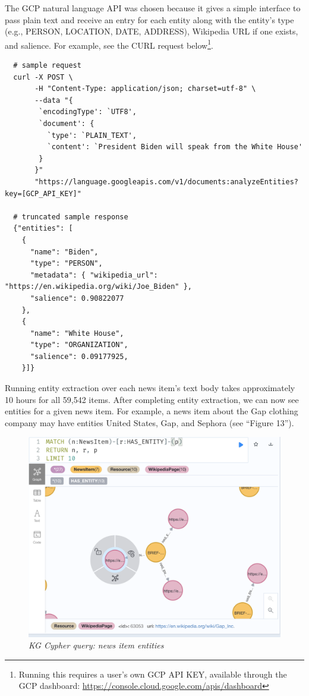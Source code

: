 \documentclass[11pt]{article}
\begin{document}
  The GCP natural language API was chosen because it gives a simple interface to pass plain text and receive an entry for each entity along with the entity's type (e.g., PERSON, LOCATION, DATE, ADDRESS), Wikipedia URL if one exists, and salience. For example, see the CURL request below\footnote{Running this requires a user's own GCP API KEY, available through the GCP dashboard: \url{https://console.cloud.google.com/apis/dashboard}}.
  \begin{lstlisting}
  # sample request
  curl -X POST \
       -H "Content-Type: application/json; charset=utf-8" \
       --data "{
        `encodingType': `UTF8',
        `document': {
          `type': `PLAIN_TEXT',
          `content': `President Biden will speak from the White House'
        }
       }"
       "https://language.googleapis.com/v1/documents:analyzeEntities?key=[GCP_API_KEY]"

  # truncated sample response
  {"entities": [
    {
      "name": "Biden",
      "type": "PERSON",
      "metadata": { "wikipedia_url": "https://en.wikipedia.org/wiki/Joe_Biden" },
      "salience": 0.90822077
    },
    {
      "name": "White House",
      "type": "ORGANIZATION",
      "salience": 0.09177925,
    }]}

  \end{lstlisting}

  Running entity extraction over each news item's text body takes approximately 10 hours for all 59,542 items. After completing entity extraction, we can now see entities for a given news item. For example, a news item about the Gap clothing company may have entities United States, Gap, and Sephora (see ``Figure 13'').

  \begin{figure}
    \centerline{\includegraphics[scale=0.5]{has-entity.png}}
    \caption{\textit{KG Cypher query: news item entities}}
  \end{figure}
\end{document}
